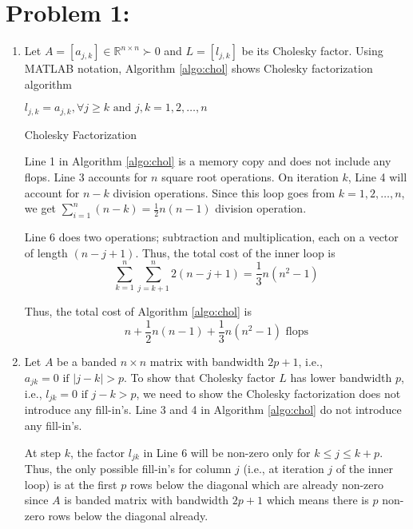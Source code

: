 \section*{Problem 1:}
\begin{enumerate}
\item Let $A = [a_{j,k}] \in \mathbb{R}^{n\times n} \succ 0$ and $L = [l_{j,k}]$ be its Cholesky factor. Using MATLAB notation, Algorithm \ref{algo:chol} shows Cholesky factorization algorithm

\begin{algorithm}[H]
\SetAlgoLined
{}
 $l_{j,k} = a_{j,k}, \forall j\geq k \text{\ and\ }  j,k= 1,2, \ldots, n$ \\
 \caption{Cholesky Factorization}
\label{algo:chol}
\end{algorithm}

\noindent Line 1 in Algorithm \ref{algo:chol} is a memory copy and does not include any flops. Line 3 accounts for $n$ square root operations. On iteration $k$, Line 4 will account for $n-k$ division operations. Since this loop goes from $k= 1,2, \ldots, n $, we get $\sum_{i=1}^{n}(n-k) = \frac{1}{2}n(n-1)$ division operation.

\noindent Line 6 does two operations; subtraction and multiplication, each on a vector of length $(n-j+1)$. Thus, the total cost of the inner loop is 
$$
\sum_{k=1}^{n} \sum_{j=k+1}^{n} 2(n-j+1) = \frac{1}{3}n(n^{2}-1)
$$

Thus, the total cost of Algorithm \ref{algo:chol} is 
$$
n + \frac{1}{2}n(n-1) + \frac{1}{3}n(n^2-1) \text{\ flops}
$$

\item 
Let $A$ be a banded $n\times n$ matrix with bandwidth $2p+1$, i.e., $a_{jk}=0 \text{\ if\ } |j-k|>p$. To show that Cholesky factor $L$ has lower bandwidth $p$, i.e.,  $l_{jk}=0 \text{\ if\ } j-k>p$, we need to show the Cholesky factorization does not introduce any fill-in's. Line 3 and 4 in Algorithm \ref{algo:chol} do not introduce any fill-in's. 

At step $k$, the factor $l_{jk}$ in Line 6 will be non-zero only for $k \leq j \leq k+p$. Thus, the only possible fill-in's for column $j$ (i.e., at iteration $j$ of the inner loop) is at the first $p$ rows below the diagonal which are already non-zero since $A$ is banded matrix with bandwidth $2p+1$ which means there is $p$ non-zero rows below the diagonal already. 


\end{enumerate}
